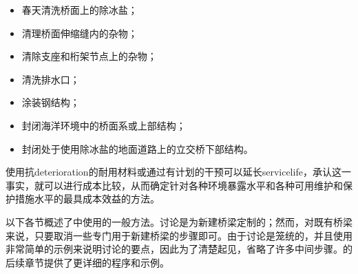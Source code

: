 \begin{itemize}
  \item 春天清洗桥面上的除冰盐；
  \item 清理桥面伸缩缝内的杂物；
  \item 清除支座和桁架节点上的杂物；
  \item 清洗排水口；
  \item 涂装钢结构；
  \item 封闭海洋环境中的桥面系​​或上部结构；
  \item 封闭处于使用除冰盐的地面道路上的立交桥下部结构。
\end{itemize}

使用抗\gls*{deterioration}的耐用材料或通过有计划的干预可以延长\gls*{servicelife}，承认这一事实，就可以进行成本比较，从而确定针对各种环境暴露水平和各种可用维护和保护措施水平的最具成本效益的方法。

以下各节概述了中使用的一般方法。讨论是为新建桥梁定制的；然而，对既有桥梁来说，只要取消一些专门用于新建桥梁的步骤即可。由于讨论是笼统的，并且使用非常简单的示例来说明讨论的要点，因此为了清楚起见，省略了许多中间步骤。的后续章节提供了更详细的程序和示例。

